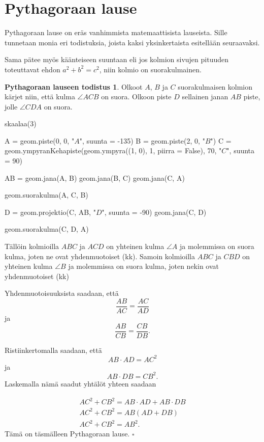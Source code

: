 \section*{Pythagoraan lause}

Pythagoraan lause on eräs vanhimmista matemaattisista lauseista. Sille tunnetaan monia eri
todistuksia, joista kaksi yksinkertaista esitellään seuraavaksi.


Sama pätee myös käänteiseen suuntaan eli jos kolmion sivujen pituuden toteuttavat ehdon $a^2 + b^2 = c^2$, niin kolmio on suorakulmainen.

\textbf{Pythagoraan lauseen todistus 1}. Olkoot $A$, $B$ ja $C$ suorakulmaisen kolmion
kärjet niin, että kulma $\angle ACB$ on suora. Olkoon piste $D$ sellainen janan $AB$ piste,
jolle $\angle CDA$ on suora.

\begin{kuva}
skaalaa(3)

A = geom.piste(0, 0, "$A$", suunta = -135)
B = geom.piste(2, 0, "$B$")
C = geom.ympyranKehapiste(geom.ympyra((1, 0), 1, piirra = False), 70, "$C$", suunta = 90)

AB = geom.jana(A, B)
geom.jana(B, C)
geom.jana(C, A)

geom.suorakulma(A, C, B)

D = geom.projektio(C, AB, "$D$", suunta = -90)
geom.jana(C, D)

geom.suorakulma(C, D, A)


\end{kuva}

Tällöin kolmioilla $ABC$ ja $ACD$ on yhteinen kulma $\angle A$ ja molemmissa on suora kulma, joten ne ovat yhdenmuotoiset (kk). Samoin kolmioilla $ABC$ ja $CBD$ on yhteinen kulma
$\angle B$ ja molemmissa on suora kulma, joten nekin ovat yhdenmuotoiset (kk)

Yhdenmuotoisuuksista saadaan, että
\[
\frac{AB}{AC} = \frac{AC}{AD}
\]
ja
\[
\frac{AB}{CB} = \frac{CB}{DB}.
\]

Ristiinkertomalla saadaan, että
\[
AB \cdot AD = AC^2
\]
ja
\[
AB \cdot DB = CB^2.
\]
Laskemalla nämä saadut yhtälöt yhteen saadaan

\begin{align*}
AC^2 + CB^2  = AB \cdot AD + AB \cdot DB \\
AC^2 + CB^2  = AB(AD + DB) \\
AC^2 + CB^2  = AB^2.
\end{align*}
Tämä on täsmälleen Pythagoraan lause. $\square $

